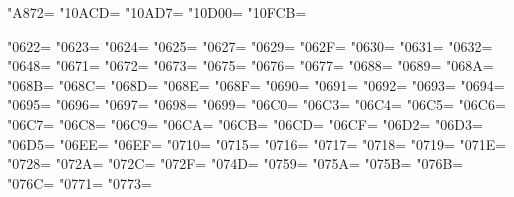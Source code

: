 \XeTeXcharclass"A872=\KclassArabL
\XeTeXcharclass"10ACD=\KclassArabL
\XeTeXcharclass"10AD7=\KclassArabL
\XeTeXcharclass"10D00=\KclassArabL
\XeTeXcharclass"10FCB=\KclassArabL

\XeTeXcharclass"0622=\KclassArabR
\XeTeXcharclass"0623=\KclassArabR
\XeTeXcharclass"0624=\KclassArabR
\XeTeXcharclass"0625=\KclassArabR
\XeTeXcharclass"0627=\KclassArabR
\XeTeXcharclass"0629=\KclassArabR
\XeTeXcharclass"062F=\KclassArabR
\XeTeXcharclass"0630=\KclassArabR
\XeTeXcharclass"0631=\KclassArabR
\XeTeXcharclass"0632=\KclassArabR
\XeTeXcharclass"0648=\KclassArabR
\XeTeXcharclass"0671=\KclassArabR
\XeTeXcharclass"0672=\KclassArabR
\XeTeXcharclass"0673=\KclassArabR
\XeTeXcharclass"0675=\KclassArabR
\XeTeXcharclass"0676=\KclassArabR
\XeTeXcharclass"0677=\KclassArabR
\XeTeXcharclass"0688=\KclassArabR
\XeTeXcharclass"0689=\KclassArabR
\XeTeXcharclass"068A=\KclassArabR
\XeTeXcharclass"068B=\KclassArabR
\XeTeXcharclass"068C=\KclassArabR
\XeTeXcharclass"068D=\KclassArabR
\XeTeXcharclass"068E=\KclassArabR
\XeTeXcharclass"068F=\KclassArabR
\XeTeXcharclass"0690=\KclassArabR
\XeTeXcharclass"0691=\KclassArabR
\XeTeXcharclass"0692=\KclassArabR
\XeTeXcharclass"0693=\KclassArabR
\XeTeXcharclass"0694=\KclassArabR
\XeTeXcharclass"0695=\KclassArabR
\XeTeXcharclass"0696=\KclassArabR
\XeTeXcharclass"0697=\KclassArabR
\XeTeXcharclass"0698=\KclassArabR
\XeTeXcharclass"0699=\KclassArabR
\XeTeXcharclass"06C0=\KclassArabR
\XeTeXcharclass"06C3=\KclassArabR
\XeTeXcharclass"06C4=\KclassArabR
\XeTeXcharclass"06C5=\KclassArabR
\XeTeXcharclass"06C6=\KclassArabR
\XeTeXcharclass"06C7=\KclassArabR
\XeTeXcharclass"06C8=\KclassArabR
\XeTeXcharclass"06C9=\KclassArabR
\XeTeXcharclass"06CA=\KclassArabR
\XeTeXcharclass"06CB=\KclassArabR
\XeTeXcharclass"06CD=\KclassArabR
\XeTeXcharclass"06CF=\KclassArabR
\XeTeXcharclass"06D2=\KclassArabR
\XeTeXcharclass"06D3=\KclassArabR
\XeTeXcharclass"06D5=\KclassArabR
\XeTeXcharclass"06EE=\KclassArabR
\XeTeXcharclass"06EF=\KclassArabR
\XeTeXcharclass"0710=\KclassArabR
\XeTeXcharclass"0715=\KclassArabR
\XeTeXcharclass"0716=\KclassArabR
\XeTeXcharclass"0717=\KclassArabR
\XeTeXcharclass"0718=\KclassArabR
\XeTeXcharclass"0719=\KclassArabR
\XeTeXcharclass"071E=\KclassArabR
\XeTeXcharclass"0728=\KclassArabR
\XeTeXcharclass"072A=\KclassArabR
\XeTeXcharclass"072C=\KclassArabR
\XeTeXcharclass"072F=\KclassArabR
\XeTeXcharclass"074D=\KclassArabR
\XeTeXcharclass"0759=\KclassArabR
\XeTeXcharclass"075A=\KclassArabR
\XeTeXcharclass"075B=\KclassArabR
\XeTeXcharclass"076B=\KclassArabR
\XeTeXcharclass"076C=\KclassArabR
\XeTeXcharclass"0771=\KclassArabR
\XeTeXcharclass"0773=\KclassArabR
